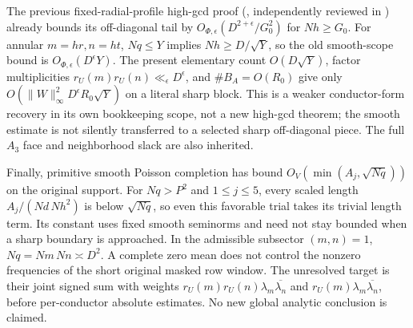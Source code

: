 \documentclass[11pt,oneside,openany]{book}
\theoremstyle{definition}\newtheorem{definition}[theorem]{Definition}
\theoremstyle{remark}\newtheorem{remark}[theorem]{Remark}
\begin{document}
The previous fixed-radial-profile high-gcd proof
(, independently reviewed in
)
already bounds its off-diagonal tail by
$O_{\Phi,\epsilon}(D^{2+\epsilon}/G_0^2)$ for $Nh\ge G_0$.
For annular $m=hr,n=ht$, $Nq\le Y$ implies $Nh\ge D/\sqrt Y$,
so the old smooth-scope bound is $O_{\Phi,\epsilon}(D^\epsilon Y)$.
The present elementary count $O(D\sqrt Y)$, factor multiplicities
$r_U(m)r_U(n)\ll_\epsilon D^\epsilon$, and $\#B_A=O(R_0)$ give only
$O(\|W\|_\infty^2D^\epsilon R_0\sqrt Y)$ on a literal sharp block.
This is a weaker conductor-form recovery in its own bookkeeping scope,
not a new high-gcd theorem; the smooth estimate is not silently
transferred to a selected sharp off-diagonal piece.
The full $A_3$ face and neighborhood slack are also inherited.

Finally, primitive smooth Poisson completion has bound
$O_V(\min(A_j,\sqrt{Nq}))$ on the original support.
For $Nq>P^2$ and $1\le j\le5$, every scaled length
$A_j/(Nd\,Nh^2)$ is below $\sqrt{Nq}$, so even this favorable trial
takes its trivial length term. Its constant uses fixed smooth
seminorms and need not stay bounded when a sharp boundary is approached.
In the admissible subsector $(m,n)=1$, $Nq=Nm\,Nn\asymp D^2$.
A complete zero mean does not control the nonzero frequencies of the
short original masked row window. The unresolved target is their
joint signed sum with weights $r_U(m)r_U(n)\lambda_m\overline{\lambda_n}$
and $r_U(m)\lambda_m\overline{\lambda_n}$, before per-conductor absolute
estimates. No new global analytic conclusion is claimed.
\end{document}
